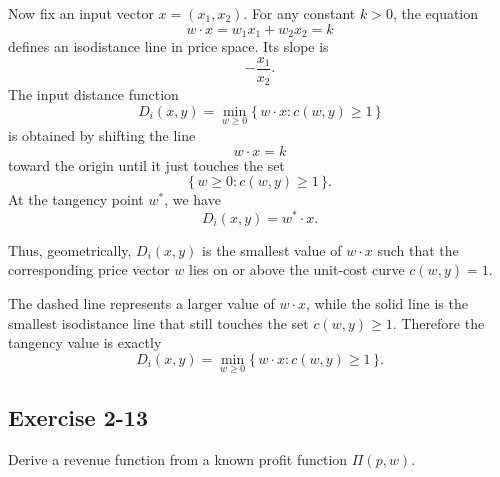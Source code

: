 Now fix an input vector \(x=(x_1,x_2)\).  
For any constant \(k>0\), the equation
\[
w\cdot x=w_1x_1+w_2x_2=k
\]
defines an isodistance line in price space. Its slope is
\[
-\frac{x_1}{x_2}.
\]
The input distance function
\[
D_i(x,y)=\min_{w\ge 0}\{\,w\cdot x : c(w,y)\ge 1\,\}
\]
is obtained by shifting the line
\[
w\cdot x=k
\]
toward the origin until it just touches the set
\[
\{\,w\ge 0 : c(w,y)\ge 1\,\}.
\]
At the tangency point \(w^*\), we have
\[
D_i(x,y)=w^*\cdot x.
\]

Thus, geometrically, \(D_i(x,y)\) is the smallest value of \(w\cdot x\) such that the corresponding price vector \(w\) lies on or above the unit-cost curve \(c(w,y)=1\).

\bigskip

\begin{center}
\end{center}

\noindent
The dashed line represents a larger value of \(w\cdot x\), while the solid line is the smallest isodistance line that still touches the set \(c(w,y)\ge 1\). Therefore the tangency value is exactly
\[
D_i(x,y)=\min_{w\ge 0}\{\,w\cdot x : c(w,y)\ge 1\,\}.
\]


\vspace{30pt}
\begin{tcolorbox}[breakable]

\subsection*{Exercise 2-13}

Derive a revenue function from a known profit function $\Pi(p,w)$.

\end{tcolorbox}



